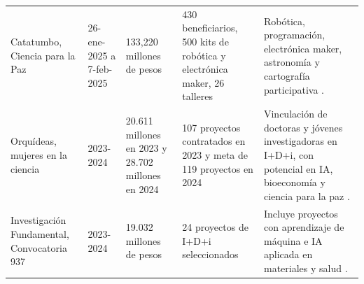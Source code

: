 \begin{table}[t]
\begin{tabular}{p{} p{} p{} p{} p{}}
Catatumbo, Ciencia para la Paz & 26-ene-2025 a 7-feb-2025 & 133,220 millones de pesos & 430 beneficiarios, 500 kits de robótica y electrónica maker, 26 talleres & Robótica, programación, electrónica maker, astronomía y cartografía participativa \parencite{minciencias_rendicion_2024_2025_pdf}. \\
Orquídeas, mujeres en la ciencia & 2023-2024 & 20.611 millones en 2023 y 28.702 millones en 2024 & 107 proyectos contratados en 2023 y meta de 119 proyectos en 2024 & Vinculación de doctoras y jóvenes investigadoras en I+D+i, con potencial en IA, bioeconomía y ciencia para la paz \parencite{minciencias_informe_gestion_2024_pdf}. \\
Investigación Fundamental, Convocatoria 937 & 2023-2024 & 19.032 millones de pesos & 24 proyectos de I+D+i seleccionados & Incluye proyectos con aprendizaje de máquina e IA aplicada en materiales y salud \parencite{minciencias_informe_gestion_2024_pdf}. \\
\hline
\end{tabular}
\normalsize
\end{table}